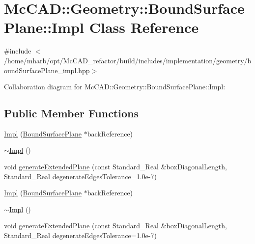 \hypertarget{classMcCAD_1_1Geometry_1_1BoundSurfacePlane_1_1Impl}{}\section{Mc\+C\+AD\+:\+:Geometry\+:\+:Bound\+Surface\+Plane\+:\+:Impl Class Reference}
\label{classMcCAD_1_1Geometry_1_1BoundSurfacePlane_1_1Impl}


{\ttfamily \#include $<$/home/mharb/opt/\+Mc\+C\+A\+D\+\_\+refactor/build/includes/implementation/geometry/bound\+Surface\+Plane\+\_\+impl.\+hpp$>$}



Collaboration diagram for Mc\+C\+AD\+:\+:Geometry\+:\+:Bound\+Surface\+Plane\+:\+:Impl\+:
\subsection*{Public Member Functions}
\begin{DoxyCompactItemize}
\item 
\hyperlink{classMcCAD_1_1Geometry_1_1BoundSurfacePlane_1_1Impl_a0ee45438392854a18ea011b5f324962f}{Impl} (\hyperlink{classMcCAD_1_1Geometry_1_1BoundSurfacePlane}{Bound\+Surface\+Plane} $\ast$back\+Reference)
\item 
\hyperlink{classMcCAD_1_1Geometry_1_1BoundSurfacePlane_1_1Impl_a4e0bf051ebb29c0beabcb090d7e76a57}{$\sim$\+Impl} ()
\item 
void \hyperlink{classMcCAD_1_1Geometry_1_1BoundSurfacePlane_1_1Impl_a4c1b0c19ec5b0b9e5afea792645eb23e}{generate\+Extended\+Plane} (const Standard\+\_\+\+Real \&box\+Diagonal\+Length, Standard\+\_\+\+Real degenerate\+Edges\+Tolerance=1.\+0e-\/7)
\item 
\hyperlink{classMcCAD_1_1Geometry_1_1BoundSurfacePlane_1_1Impl_a0ee45438392854a18ea011b5f324962f}{Impl} (\hyperlink{classMcCAD_1_1Geometry_1_1BoundSurfacePlane}{Bound\+Surface\+Plane} $\ast$back\+Reference)
\item 
\hyperlink{classMcCAD_1_1Geometry_1_1BoundSurfacePlane_1_1Impl_a4e0bf051ebb29c0beabcb090d7e76a57}{$\sim$\+Impl} ()
\item 
void \hyperlink{classMcCAD_1_1Geometry_1_1BoundSurfacePlane_1_1Impl_a4c1b0c19ec5b0b9e5afea792645eb23e}{generate\+Extended\+Plane} (const Standard\+\_\+\+Real \&box\+Diagonal\+Length, Standard\+\_\+\+Real degenerate\+Edges\+Tolerance=1.\+0e-\/7)
\end{DoxyCompactItemize}
